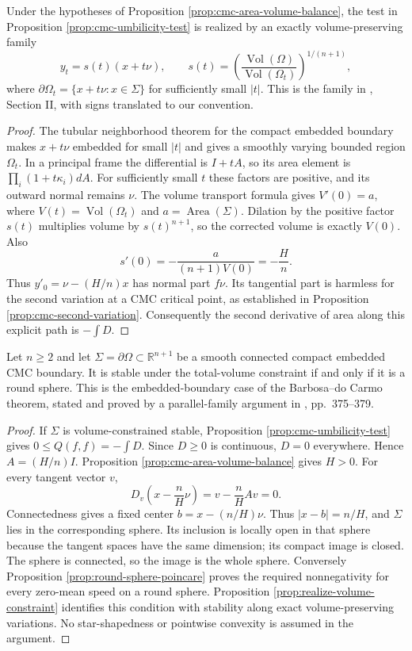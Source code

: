 \begin{proposition}\label{prop:cmc-parallel-volume-path}
Under the hypotheses of Proposition \ref{prop:cmc-area-volume-balance}, the test in Proposition \ref{prop:cmc-umbilicity-test} is realized by an exactly volume-preserving family
\[
 y_t=s(t)(x+t\nu),\qquad
 s(t)=\left(\frac{\operatorname{Vol}(\Omega)}{\operatorname{Vol}(\Omega_t)}\right)^{1/(n+1)},
\]
where $\partial\Omega_t=\{x+t\nu:x\in\Sigma\}$ for sufficiently small $|t|$. This is the family in \cite{Wen91}, Section II, with signs translated to our convention.
\end{proposition}
\begin{proof}
The tubular neighborhood theorem for the compact embedded boundary makes $x+t\nu$ embedded for small $|t|$ and gives a smoothly varying bounded region $\Omega_t$. In a principal frame the differential is $I+tA$, so its area element is $\prod_i(1+t\kappa_i)dA$. For sufficiently small $t$ these factors are positive, and its outward normal remains $\nu$. The volume transport formula gives $V'(0)=a$, where $V(t)=\operatorname{Vol}(\Omega_t)$ and $a=\operatorname{Area}(\Sigma)$.
Dilation by the positive factor $s(t)$ multiplies volume by $s(t)^{n+1}$, so the corrected volume is exactly $V(0)$. Also
\[
 s'(0)=-\frac{a}{(n+1)V(0)}=-\frac Hn.
\]
Thus $y'_0=\nu-(H/n)x$ has normal part $f\nu$. Its tangential part is harmless for the second variation at a CMC critical point, as established in Proposition \ref{prop:cmc-second-variation}. Consequently the second derivative of area along this explicit path is $-\int D$.
\end{proof}

\begin{theorem}\label{thm:euclidean-cmc-stability-rigidity}
Let $n\geq2$ and let $\Sigma=\partial\Omega\subset\mathbb R^{n+1}$ be a smooth connected compact embedded CMC boundary. It is stable under the total-volume constraint if and only if it is a round sphere. This is the embedded-boundary case of the Barbosa--do Carmo theorem, stated and proved by a parallel-family argument in \cite{Wen91}, pp.~375--379.
\end{theorem}
\begin{proof}
If $\Sigma$ is volume-constrained stable, Proposition \ref{prop:cmc-umbilicity-test} gives $0\leq Q(f,f)=-\int D$. Since $D\geq0$ is continuous, $D=0$ everywhere. Hence $A=(H/n)I$. Proposition \ref{prop:cmc-area-volume-balance} gives $H>0$. For every tangent vector $v$,
\[
 D_v\left(x-\frac nH\nu\right)=v-\frac nH Av=0.
\]
Connectedness gives a fixed center $b=x-(n/H)\nu$. Thus $|x-b|=n/H$, and $\Sigma$ lies in the corresponding sphere. Its inclusion is locally open in that sphere because the tangent spaces have the same dimension; its compact image is closed. The sphere is connected, so the image is the whole sphere. Conversely Proposition \ref{prop:round-sphere-poincare} proves the required nonnegativity for every zero-mean speed on a round sphere. Proposition \ref{prop:realize-volume-constraint} identifies this condition with stability along exact volume-preserving variations. No star-shapedness or pointwise convexity is assumed in the argument.
\end{proof}
